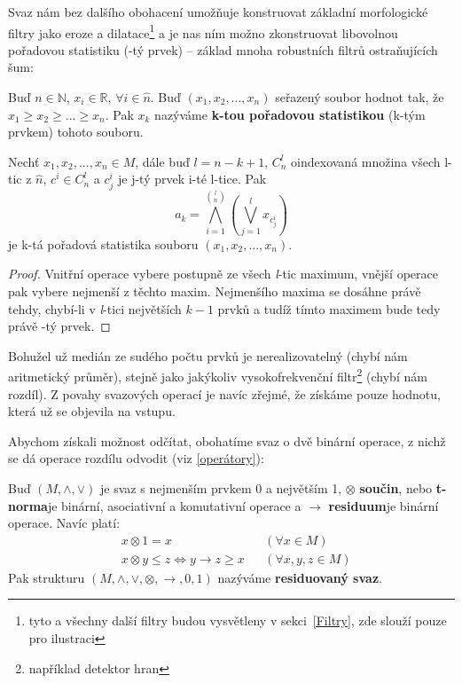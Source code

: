     Svaz nám bez dalšího obohacení umožňuje konstruovat základní morfologické filtry jako eroze a dilatace\footnote{tyto a všechny další filtry budou vysvětleny v sekci~\ref{Filtry}, zde slouží pouze pro ilustraci} a je nas ním možno zkonstruovat libovolnou pořadovou statistiku (\kk-tý prvek) -- základ mnoha robustních filtrů ostraňujících šum:

    \begin{define}\label{def k-prvek}
      Buď $n \in \mathbb{N}$, $x_i \in \mathbb{R}, \,\forall i \in \widehat n$. Buď $(x_1,x_2,...,x_n)$ seřazený soubor hodnot tak, že $x_1 \geq x_2 \geq ... \geq x_n$. Pak $x_k$ nazýváme \textbf{k-tou pořadovou statistikou} (k-tým prvkem) tohoto souboru.
    \end{define}

    \begin{theo}\label{theo k-tý prvek}
      Nechť $x_1,x_2,...,x_n \in M$, dále buď $l = n-k+1$, $C^{l}_n$ oindexovaná množina všech l-tic z $\widehat n$, $c^i \in C^{l}_n$ a $c^i_j$ je j-tý prvek i-té l-tice. Pak
      \[
        a_k = \bigwedge_{i = 1}^{{l}\choose{n}}\left( \bigvee_{j = 1}^{l} x_{c_{j}^i} \right)
      \]
      je k-tá pořadová statistika souboru $(x_1,x_2,...,x_n)$.
    \end{theo}
    \begin{proof}
      Vnitřní operace vybere postupně ze všech \textit{l}-tic maximum, vnější operace pak vybere nejmenší z těchto maxim. Nejmenšího maxima se dosáhne právě tehdy, chybí-li v \textit{l}-tici největších $k-1$ prvků a tudíž tímto maximem bude tedy právě \kk-tý prvek.
    \end{proof}

    Bohužel už medián ze sudého počtu prvků je nerealizovatelný (chybí nám aritmetický průměr), stejně jako jakýkoliv vysokofrekvenční filtr\footnote{například detektor hran} (chybí nám rozdíl). Z povahy svazových operací je navíc zřejmé, že získáme pouze hodnotu, která už se objevila na vstupu.

    Abychom získali možnost odčítat, obohatíme svaz o dvě binární operace, z nichž se dá operace rozdílu odvodit (viz \ref{operátory}):

    \begin{define}\label{def residuovaný svaz}
    Buď $(M,\wedge,\vee)$ je svaz s nejmenším prvkem 0 a největším 1, $\otimes$ \rl \textbf{součin}, nebo \textbf{t-norma}\rr je binární, asociativní a komutativní operace a $\rightarrow$ \rl \textbf{residuum}\rr je binární operace. Navíc platí:
    \begin{align}
    &x \otimes 1 = x  &&(\forall x \in M)\\
    &x \otimes y \leq z \Leftrightarrow y \rightarrow z \geq x &&(\forall x,y,z \in M)\label{Galoisova koresp}
    \end{align}
    Pak strukturu $(M,\wedge,\vee,\otimes,\rightarrow,0,1)$ nazýváme \textbf{residuovaný svaz}.
    \end{define}

